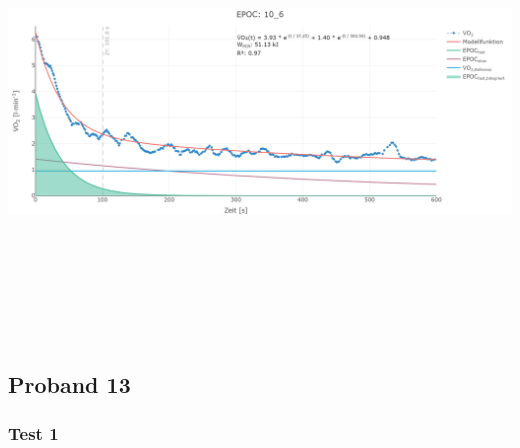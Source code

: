 \documentclass[
  letterpaper,
  DIV=11]{scrartcl}
\begin{document}
\includegraphics[width=11.45833in,height=4.6875in]{images/10_6.png}

\subsection{Proband 13}

\subsubsection{Test 1}
\end{document}
